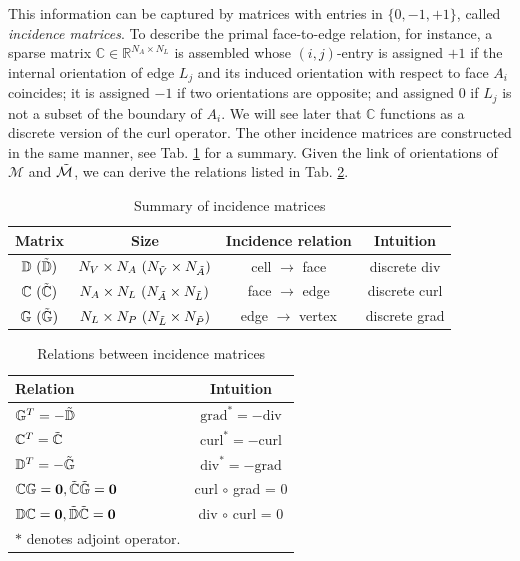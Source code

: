 \documentclass{article}
\begin{document}
This information can be captured by matrices with entries in $\{0,-1,+1\}$, called \emph{incidence matrices}. To describe the primal face-to-edge relation, for instance, a sparse matrix $\mathbb{C} \in \mathbb{R}^{N_A \times N_L}$ is assembled whose $(i,j)$-entry is assigned $+1$ if the internal orientation of edge $L_j$ and its induced orientation with respect to face $A_i$ coincides; it is assigned $-1$ if two orientations are opposite; and assigned $0$ if $L_j$ is not a subset of the boundary of $A_i$. We will see later that $\mathbb{C}$ functions as a discrete version of the curl operator. The other incidence matrices are constructed in the same manner, see Tab. \ref{tab:incidence_mat} for a summary. Given the link of orientations of $\mathcal{M}$ and $\Tilde{\mathcal{M}}$, we can derive the relations listed in Tab. \ref{tab:incidence_relation}.  

\begin{table}[h!]
    \centering
    \begin{tabular}{c c c c}
    \hline
         Matrix & Size & Incidence relation & Intuition  \\
    \hline
         $\mathbb{D}\ (\Tilde{\mathbb{D}})$ & $N_V \times N_A\ (N_{\Tilde{V}} \times N_{\Tilde{A}})$ & cell $\rightarrow$ face & discrete div \\
         $\mathbb{C}\ (\Tilde{\mathbb{C}})$ & $N_A \times N_L\ (N_{\Tilde{A}} \times N_{\Tilde{L}})$ & face $\rightarrow$ edge & discrete curl \\
         $\mathbb{G}\ (\Tilde{\mathbb{G}})$ & $N_L \times N_P\ (N_{\Tilde{L}} \times N_{\Tilde{P}})$ & edge $\rightarrow$ vertex & discrete grad \\
    \hline
    \end{tabular}
    \caption{Summary of incidence matrices}
    \label{tab:incidence_mat}
\end{table}

\begin{table}[h!]
    \centering
    \begin{tabular}{l c}
    \hline
         Relation & Intuition \\
    \hline
         $\mathbb{G}^T = -\Tilde{\mathbb{D}}$  &  $\text{grad}^* = - \text{div}$\\
         $\mathbb{C}^T = \Tilde{\mathbb{C}}$   &  $\text{curl}^* = - \text{curl}$\\
         $\mathbb{D}^T = -\Tilde{\mathbb{G}}$  &  $\text{div}^* = - \text{grad}$\\
         $\mathbb{C}\mathbb{G} = \mathbf{0}, \Tilde{\mathbb{C}}\Tilde{\mathbb{G}} = \mathbf{0}$  &  curl $\circ$ grad = 0 \\
         $\mathbb{D}\mathbb{C} = \mathbf{0}, \Tilde{\mathbb{D}}\Tilde{\mathbb{C}} = \mathbf{0}$   &  div $\circ$ curl = 0 \\
    \hline
        \small $\ast$ denotes adjoint operator.
    \end{tabular}
    \caption{Relations between incidence matrices}
    \label{tab:incidence_relation}
\end{table}
\end{document}
